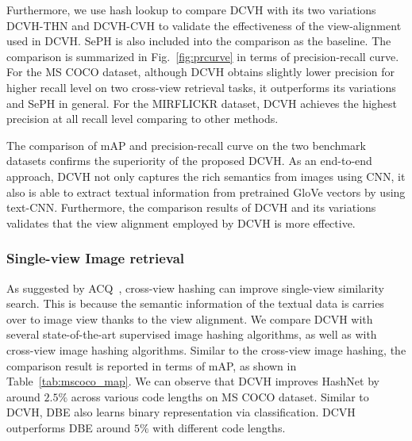 \documentclass[10pt,twocolumn,letterpaper]{article}
\begin{document}
Furthermore, we use hash lookup to compare DCVH with its two variations DCVH-THN and DCVH-CVH to validate the effectiveness of the view-alignment used in DCVH. SePH is also included into the comparison as the baseline. The comparison is summarized in Fig.~\ref{fig:prcurve} in terms of precision-recall curve. For the MS COCO dataset, although DCVH obtains slightly lower precision for higher recall level on two cross-view retrieval tasks, it outperforms its variations and SePH in general. For the MIRFLICKR dataset, DCVH achieves the highest precision at all recall level comparing to other methods.

The comparison of mAP and precision-recall curve on the two benchmark datasets confirms the superiority of the proposed DCVH. As an end-to-end approach, DCVH not only captures the rich semantics from images using CNN, it also is able to extract textual information from pretrained GloVe vectors by using text-CNN. Furthermore, the comparison results of DCVH and its variations validates that the view alignment employed by DCVH is more effective.

\subsubsection{Single-view Image retrieval}\label{sec:singleimage}

As suggested by ACQ~\cite{acq}, cross-view hashing can improve single-view similarity search. This is because the semantic information of the textual data is carries over to image view thanks to the view alignment. We compare DCVH with several state-of-the-art supervised image hashing algorithms, as well as with cross-view image hashing algorithms. Similar to the cross-view image hashing, the comparison result is reported in terms of mAP, as shown in Table~\ref{tab:mscoco_map}. We can observe that DCVH improves HashNet by around $2.5\%$ across various code lengths on MS COCO dataset. Similar to DCVH, DBE also learns binary representation via classification. DCVH outperforms DBE around $5\%$ with different code lengths.
\end{document}
